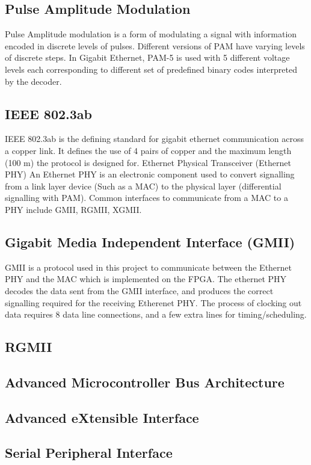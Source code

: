 \subsection{Pulse Amplitude Modulation}
Pulse Amplitude modulation is a form of modulating a signal with information encoded in discrete levels of pulses.
Different versions of PAM have varying levels of discrete steps. In Gigabit Ethernet, PAM-5 is used with 5 
different voltage levels each corresponding to different set of predefined binary codes interpreted by the 
decoder.

\subsection{IEEE 802.3ab}
IEEE 802.3ab is the defining standard for gigabit ethernet communication across a copper link. 
It defines the use of 4 pairs of copper and the maximum length (100 m) the protocol is designed for.
Ethernet Physical Transceiver (Ethernet PHY)
An Ethernet PHY is an electronic component used to convert signalling from a link layer device (Such as a MAC) 
to the physical layer (differential signalling with PAM). Common interfaces to communicate from a MAC to a PHY 
include GMII, RGMII, XGMII.

\subsection{Gigabit Media Independent Interface (GMII)}
GMII is a protocol used in this project to communicate between the Ethernet PHY and the MAC which is implemented 
on the FPGA. The ethernet PHY decodes the data sent from the GMII interface, and produces the correct signalling 
required for the receiving Etherenet PHY. The process of clocking out data requires 8 data line connections, 
and a few extra lines for timing/scheduling.

\subsection{RGMII}

\subsection{Advanced Microcontroller Bus Architecture}

\subsection{Advanced eXtensible Interface}

\subsection{Serial Peripheral Interface}
